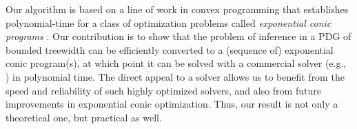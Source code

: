 Our algorithm
is based on a line of  work in 
convex programming
that establishes
polynomial-time
for a class of optimization problems called \emph{exponential conic programs}
\parencite{badenbroek2021algorithm,skajaa2015homogeneous,nesterov1996infeasible}.
Our contribution is to show that the problem of inference in a PDG
of bounded treewidth
can be efficiently converted to a (sequence of) exponential conic program(s), at which point it can be solved with a commercial solver
(e.g., \textcite{mosek}) in polynomial time. 
The direct appeal to a solver allows us
to benefit from the speed and reliability of such highly optimized solvers, and also from future improvements in exponential conic optimization.
Thus, our result is not only a theoretical one, but practical as well.



